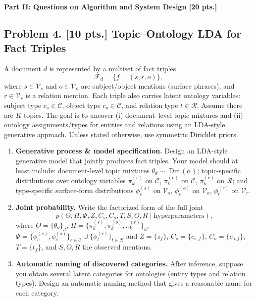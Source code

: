 \documentclass[11pt,a4paper]{article}
\begin{document}
\noindent\textbf{Part II: Questions on Algorithm and System Design [20 pts.]}




\subsection{Problem 4. [10 pts.] Topic--Ontology LDA for Fact Triples}
A document $d$ is represented by a multiset of fact triples
\[
\mathcal{F}_d = \{ f = (s, r, o) \},
\]
where $s \in \mathcal{V}_s$ and $o \in \mathcal{V}_o$ are subject/object mentions (surface phrases), and $r \in \mathcal{V}_r$ is a relation mention. Each triple also carries latent ontology variables: subject type $c_s \in \mathcal{C}$, object type $c_o \in \mathcal{C}$, and relation type $t \in \mathcal{R}$. Assume there are $K$ topics. The goal is to uncover (i) document--level topic mixtures and (ii) ontology assignments/types for entities and relations using an LDA-style generative approach. Unless stated otherwise, use symmetric Dirichlet priors.
\begin{enumerate}[label=(\alph*)]
    \item \textbf{Generative process \& model specification.} Design an LDA-style generative model that jointly produces fact triples. Your model should at least include: document-level topic mixtures $\theta_d \sim \operatorname{Dir}(\alpha)$; topic-specific distributions over ontology variables $\pi_k^{(s)}$ on $\mathcal{C}$, $\pi_k^{(o)}$ on $\mathcal{C}$, $\pi_k^{(r)}$ on $\mathcal{R}$; and type-specific surface-form distributions $\phi_c^{(s)}$ on $\mathcal{V}_s$, $\phi_c^{(o)}$ on $\mathcal{V}_o$, $\phi_t^{(r)}$ on $\mathcal{V}_r$.
    \item \textbf{Joint probability.} Write the factorized form of the full joint
    \[
    p(\Theta, \Pi, \Phi, Z, C_s, C_o, T, S, O, R \mid \text{hyperparameters}),
    \]
    where $\Theta = \{\theta_d\}_{d}$, $\Pi = \{\pi_k^{(s)}, \pi_k^{(o)}, \pi_k^{(r)}\}_{k}$, $\Phi = \{\phi_c^{(s)}, \phi_c^{(o)}\}_{c \in \mathcal{C}} \cup \{\phi_t^{(r)}\}_{t \in \mathcal{R}}$ and $Z = \{z_f\}$, $C_s = \{c_{s,f}\}$, $C_o = \{c_{o,f}\}$, $T = \{t_f\}$, and $S, O, R$ the observed mentions.
    \item \textbf{Automatic naming of discovered categories.} After inference, suppose you obtain several latent categories for ontologies (entity types and relation types). Design an automatic naming method that gives a reasonable name for each category.
\end{enumerate}
\end{document}

